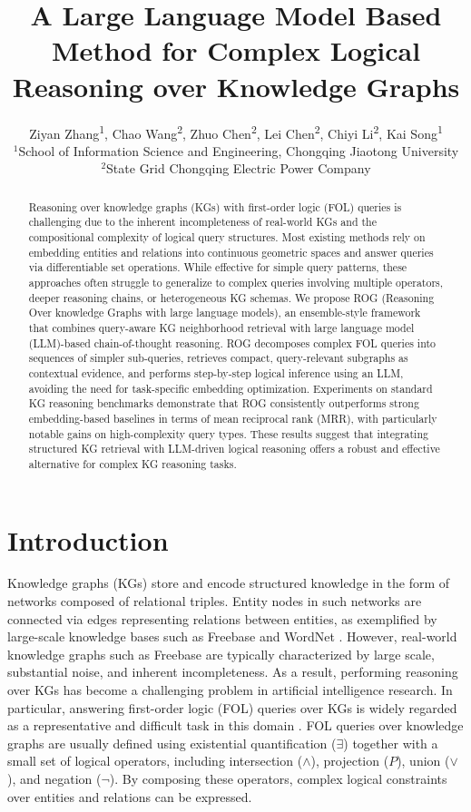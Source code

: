 \documentclass[11pt]{article}
\title{A Large Language Model Based Method for Complex Logical Reasoning over Knowledge Graphs}
\author{Ziyan Zhang\textsuperscript{1}, Chao Wang\textsuperscript{2}, Zhuo Chen\textsuperscript{2}, Lei Chen\textsuperscript{2}, Chiyi Li\textsuperscript{2}, Kai Song\textsuperscript{1} \\
$^1$School of Information Science and Engineering, Chongqing Jiaotong University\\ $^2$State Grid Chongqing Electric Power Company\\
}
\begin{document}
\maketitle

\begin{abstract}
Reasoning over knowledge graphs (KGs) with first-order logic (FOL) queries is challenging due to the inherent incompleteness of real-world KGs and the compositional complexity of logical query structures.
Most existing methods rely on embedding entities and relations into continuous geometric spaces and answer queries via differentiable set operations. While effective for simple query patterns, these approaches often struggle to generalize to complex queries involving multiple operators, deeper reasoning chains, or heterogeneous KG schemas.
We propose ROG (Reasoning Over knowledge Graphs with large language models), an ensemble-style framework that combines query-aware KG neighborhood retrieval with large language model (LLM)-based chain-of-thought reasoning. ROG decomposes complex FOL queries into sequences of simpler sub-queries, retrieves compact, query-relevant subgraphs as contextual evidence, and performs step-by-step logical inference using an LLM, avoiding the need for task-specific embedding optimization.
Experiments on standard KG reasoning benchmarks demonstrate that ROG consistently outperforms strong embedding-based baselines in terms of mean reciprocal rank (MRR), with particularly notable gains on high-complexity query types. These results suggest that integrating structured KG retrieval with LLM-driven logical reasoning offers a robust and effective alternative for complex KG reasoning tasks.
\end{abstract}

\section{Introduction}
Knowledge graphs (KGs) store and encode structured knowledge in the form of networks composed of relational triples.
Entity nodes in such networks are connected via edges representing relations between entities, as exemplified by large-scale knowledge bases such as Freebase \citep{bollacker2008freebase} and WordNet \citep{miller1995wordnet}.
However, real-world knowledge graphs such as Freebase are typically characterized by large scale, substantial noise, and inherent incompleteness.
As a result, performing reasoning over KGs has become a challenging problem in artificial intelligence research.
In particular, answering first-order logic (FOL) queries \citep{enderton2001mathematical} over KGs is widely regarded as a representative and difficult task in this domain \citep{liang2024kg}.
FOL queries over knowledge graphs are usually defined using existential quantification ($\exists$) together with a small set of logical operators, including intersection ($\wedge$), projection ($P$), union ($\vee$), and negation ($\neg$).
By composing these operators, complex logical constraints over entities and relations can be expressed.
\end{document}
